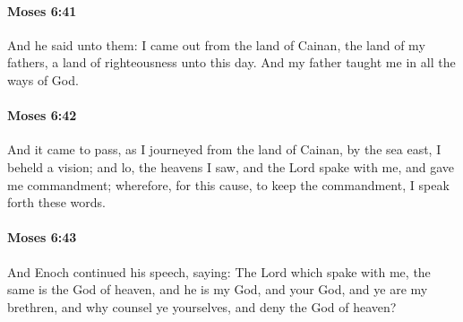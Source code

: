 		\paragraph{Moses 6:41} %
			\label{MOSES-6-41}

			And he said unto them: I came out from the land of Cainan, the land of my fathers, a land of righteousness unto this day. And my father taught me in all the ways of God.


		\paragraph{Moses 6:42} %
			\label{MOSES-6-42}

			And it came to pass, as I journeyed from the land of Cainan, by the sea east, I beheld a vision; and lo, the heavens I saw, and the Lord spake with me, and gave me commandment; wherefore, for this cause, to keep the commandment, I speak forth these words.


		\paragraph{Moses 6:43} %
			\label{MOSES-6-43}

			And Enoch continued his speech, saying: The Lord which spake with me, the same is the God of heaven, and he is my God, and your God, and ye are my brethren, and why counsel ye yourselves, and deny the God of heaven?


